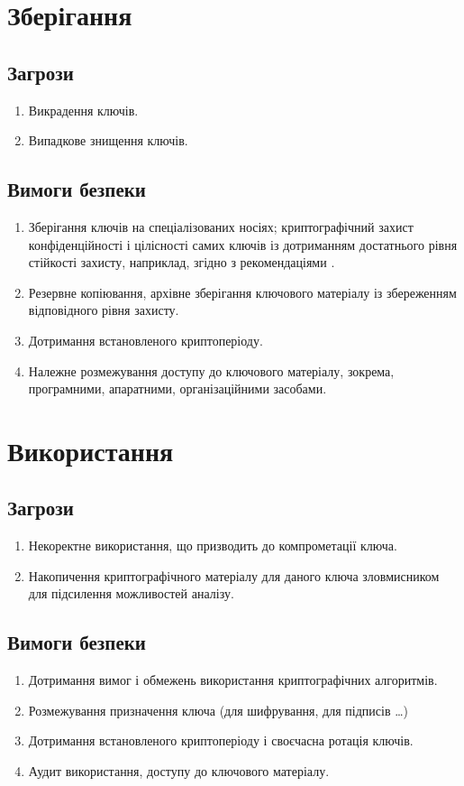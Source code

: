 \documentclass{kpi-lab}
\begin{document}
\section{Зберігання}
\subsection{Загрози}
\begin{enumerate}
  \item
    Викрадення ключів.
  \item
    Випадкове знищення ключів.
\end{enumerate}
\subsection{Вимоги безпеки}
\begin{enumerate}
  \item
    Зберігання ключів на спеціалізованих носіях;
    криптографічний захист конфіденційності і цілісності
    самих ключів із дотриманням  достатнього рівня
    стійкості захисту, наприклад, згідно з
    рекомендаціями \cite{Barker2020a}.
  \item
    Резервне копіювання, архівне зберігання ключового матеріалу із
    збереженням відповідного рівня захисту.
  \item
    Дотримання встановленого криптоперіоду.
  \item
    Належне розмежування доступу до ключового
    матеріалу, зокрема, програмними, апаратними,
    організаційними засобами.
\end{enumerate}

\section{Використання}
\subsection{Загрози}
\begin{enumerate}
  \item
    Некоректне використання, що призводить до компрометації ключа.
  \item
    Накопичення криптографічного матеріалу для даного
    ключа зловмисником для підсилення можливостей аналізу.
\end{enumerate}
\subsection{Вимоги безпеки}
\begin{enumerate}
  \item
    Дотримання вимог і обмежень використання
    криптографічних алгоритмів.
  \item
    Розмежування призначення ключа (для шифрування, для
    підписів \dots)
  \item
    Дотримання встановленого криптоперіоду і своєчасна
    ротація ключів.
  \item
    Аудит використання, доступу до ключового матеріалу.
\end{enumerate}
\end{document}
